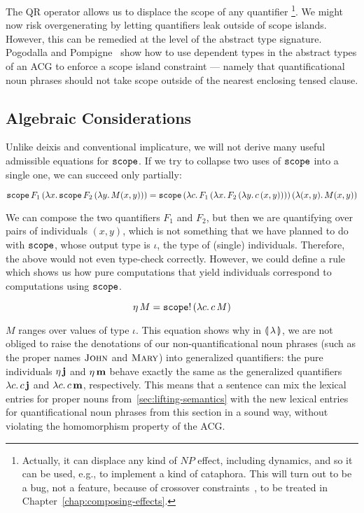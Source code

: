 The QR operator allows us to displace the scope of any quantifier
\footnote{Actually, it can displace any kind of $NP$ effect, including
  dynamics, and so it can be used, e.g., to implement a kind of
  cataphora. This will turn out to be a bug, not a feature, because of
  crossover constraints~\cite{shan2006explaining}, to be treated in
  Chapter~\ref{chap:composing-effects}.}. We might now risk overgenerating
by letting quantifiers leak outside of scope islands. However, this can be
remedied at the level of the abstract type signature. Pogodalla and
Pompigne~\cite{pogodalla2012controlling} show how to use dependent types in
the abstract types of an ACG to enforce a scope island constraint ---
namely that quantificational noun phrases should not take scope outside of
the nearest enclosing tensed clause.


\subsection{Algebraic Considerations}
\label{ssec:algebraic-quantification}

Unlike deixis and conventional implicature, we will not derive many useful
admissible equations for $\mathtt{scope}$. If we try to collapse two uses of
$\mathtt{scope}$ into a single one, we can succeed only partially:

$$
\mathtt{scope}\,F_1\,(\lambda x.\, \mathtt{scope}\,F_2\,(\lambda y.\, M(x,y)))
= \mathtt{scope}\,(\lambda c.\, F_1\,(\lambda x.\, F_2\,(\lambda y.\, c\,(x,y))))\,(\lambda (x,y).\, M(x,y))
$$

We can compose the two quantifiers $F_1$ and $F_2$, but then we are
quantifying over pairs of individuals $(x,y)$, which is not something that
we have planned to do with $\mathtt{scope}$, whose output type is $\iota$, the
type of (single) individuals. Therefore, the above would not even
type-check correctly. However, we could define a rule which shows us how
pure computations that yield individuals correspond to computations using
$\mathtt{scope}$.

$$
\eta\,M = \mathtt{scope}!\,(\lambda c.\, c\,M)
$$

$M$ ranges over values of type $\iota$. This equation shows why in
$\llparenthesis \, \lambda \, \rrparenthesis$, we are not obliged to raise the denotations of our
non-quantificational noun phrases (such as the proper names $\textsc{John}$
and $\textsc{Mary}$) into generalized quantifiers: the pure individuals
$\eta\,\textbf{j}$ and $\eta\,\textbf{m}$ behave exactly the same as the
generalized quantifiers $\lambda c.\, c\,\textbf{j}$ and
$\lambda c.\, c\,\textbf{m}$, respectively. This means that a sentence can
mix the lexical entries for proper nouns from~\ref{sec:lifting-semantics}
with the new lexical entries for quantificational noun phrases from this
section in a sound way, without violating the homomorphism property of the
ACG.

